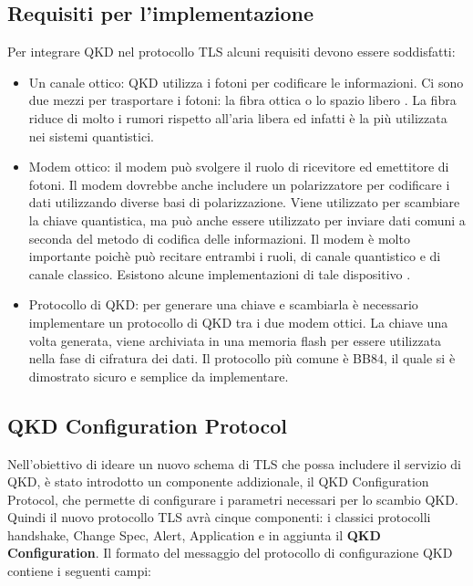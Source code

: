 \subsection{Requisiti per l'implementazione}
Per integrare QKD nel protocollo TLS alcuni requisiti devono essere soddisfatti:
\begin{itemize}
    \item Un canale ottico: QKD utilizza i fotoni per codificare le informazioni. Ci sono due mezzi per trasportare i fotoni: la fibra ottica o lo spazio libero \cite{hughes_practical_2002}. La fibra riduce di molto i rumori rispetto all'aria libera ed infatti è la più utilizzata nei sistemi quantistici.
    
    \item Modem ottico: il modem può svolgere il ruolo di ricevitore ed emettitore di fotoni. Il modem dovrebbe anche includere un polarizzatore per codificare i dati utilizzando diverse basi di polarizzazione. Viene utilizzato per scambiare la chiave quantistica, ma può anche essere utilizzato per inviare dati comuni a seconda del metodo di codifica delle informazioni. Il modem è molto importante poichè può recitare entrambi i ruoli, di canale quantistico e di canale classico. Esistono alcune implementazioni di tale dispositivo \cite{thesis}.
    
    \item Protocollo di QKD: per generare una chiave e scambiarla è necessario implementare un protocollo di QKD tra i due modem ottici. La chiave una volta generata, viene archiviata in una memoria flash per essere utilizzata nella fase di cifratura dei dati. Il protocollo più comune è BB84, il quale si è dimostrato sicuro e semplice da implementare.
\end{itemize}

\subsection{QKD Configuration Protocol}
Nell’obiettivo di ideare un nuovo schema di TLS che possa includere il servizio di QKD, è stato introdotto un componente addizionale, il QKD Configuration Protocol, che permette di configurare i parametri necessari per lo scambio QKD. Quindi il nuovo protocollo TLS avrà cinque componenti: i classici protocolli handshake, Change Spec, Alert, Application e in aggiunta il \textbf{QKD Configuration}. Il formato del messaggio del protocollo di configurazione QKD contiene i seguenti campi:

